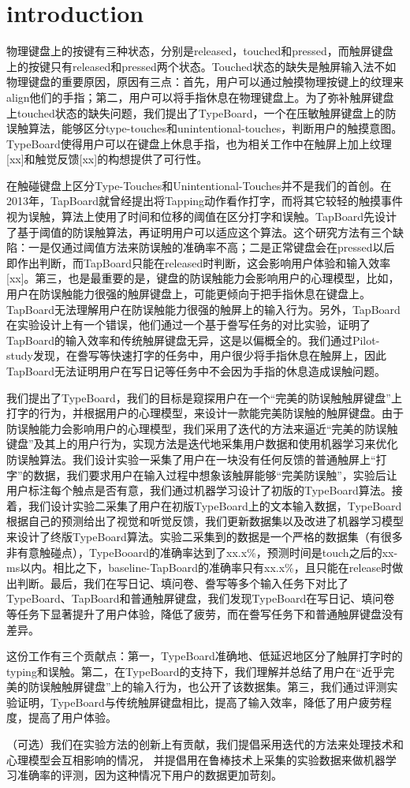 \section{introduction}

物理键盘上的按键有三种状态，分别是released，touched和pressed，而触屏键盘上的按键只有released和pressed两个状态。Touched状态的缺失是触屏输入法不如物理键盘的重要原因，原因有三点：首先，用户可以通过触摸物理按键上的纹理来align他们的手指；第二，用户可以将手指休息在物理键盘上。为了弥补触屏键盘上touched状态的缺失问题，我们提出了TypeBoard，一个在压敏触屏键盘上的防误触算法，能够区分type-touches和unintentional-touches，判断用户的触摸意图。TypeBoard使得用户可以在键盘上休息手指，也为相关工作中在触屏上加上纹理[xx]和触觉反馈[xx]的构想提供了可行性。

在触碰键盘上区分Type-Touches和Unintentional-Touches并不是我们的首创。在2013年，TapBoard就曾经提出将Tapping动作看作打字，而将其它较轻的触摸事件视为误触，算法上使用了时间和位移的阈值在区分打字和误触。TapBoard先设计了基于阈值的防误触算法，再证明用户可以适应这个算法。这个研究方法有三个缺陷：一是仅通过阈值方法来防误触的准确率不高；二是正常键盘会在pressed以后即作出判断，而TapBoard只能在released时判断，这会影响用户体验和输入效率[xx]。第三，也是最重要的是，键盘的防误触能力会影响用户的心理模型，比如，用户在防误触能力很强的触屏键盘上，可能更倾向于把手指休息在键盘上。TapBoard无法理解用户在防误触能力很强的触屏上的输入行为。另外，TapBoard在实验设计上有一个错误，他们通过一个基于誊写任务的对比实验，证明了TapBoard的输入效率和传统触屏键盘无异，这是以偏概全的。我们通过Pilot-study发现，在誊写等快速打字的任务中，用户很少将手指休息在触屏上，因此TapBoard无法证明用户在写日记等任务中不会因为手指的休息造成误触问题。

我们提出了TypeBoard，我们的目标是窥探用户在一个“完美的防误触触屏键盘”上打字的行为，并根据用户的心理模型，来设计一款能完美防误触的触屏键盘。由于防误触能力会影响用户的心理模型，我们采用了迭代的方法来逼近“完美的防误触键盘”及其上的用户行为，实现方法是迭代地采集用户数据和使用机器学习来优化防误触算法。我们设计实验一采集了用户在一块没有任何反馈的普通触屏上“打字”的数据，我们要求用户在输入过程中想象该触屏能够“完美防误触”，实验后让用户标注每个触点是否有意，我们通过机器学习设计了初版的TypeBoard算法。接着，我们设计实验二采集了用户在初版TypeBoard上的文本输入数据，TypeBoard根据自己的预测给出了视觉和听觉反馈，我们更新数据集以及改进了机器学习模型来设计了终版TypeBoard算法。实验二采集到的数据是一个严格的数据集（有很多非有意触碰点），TypeBooard的准确率达到了xx.x\%，预测时间是touch之后的xx-ms以内。相比之下，baseline-TapBoard的准确率只有xx.x\%，且只能在release时做出判断。最后，我们在写日记、填问卷、誊写等多个输入任务下对比了TypeBoard、TapBoard和普通触屏键盘，我们发现TypeBoard在写日记、填问卷等任务下显著提升了用户体验，降低了疲劳，而在誊写任务下和普通触屏键盘没有差异。

这份工作有三个贡献点：第一，TypeBoard准确地、低延迟地区分了触屏打字时的typing和误触。第二，在TypeBoard的支持下，我们理解并总结了用户在“近乎完美的防误触触屏键盘”上的输入行为，也公开了该数据集。第三，我们通过评测实验证明，TypeBoard与传统触屏键盘相比，提高了输入效率，降低了用户疲劳程度，提高了用户体验。

（可选）我们在实验方法的创新上有贡献，我们提倡采用迭代的方法来处理技术和心理模型会互相影响的情况， 并提倡用在鲁棒技术上采集的实验数据来做机器学习准确率的评测，因为这种情况下用户的数据更加苛刻。
